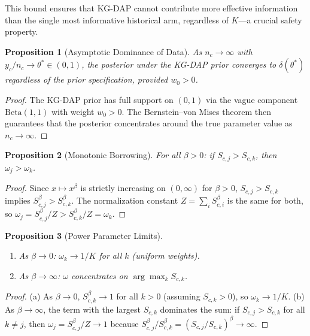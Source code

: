 \documentclass[12pt]{article}
\newtheorem{proposition}{Proposition}
\begin{document}
This bound ensures that KG-DAP cannot contribute more effective information than the single most informative historical arm, regardless of $K$---a crucial safety property.

\begin{proposition}[Asymptotic Dominance of Data]
\label{prop:asymptotic}
As $n_c \to \infty$ with $y_c / n_c \to \theta^* \in (0,1)$, the posterior under the KG-DAP prior converges to $\delta(\theta^*)$ regardless of the prior specification, provided $w_0 > 0$.
\end{proposition}

\begin{proof}
The KG-DAP prior has full support on $(0,1)$ via the vague component $\mathrm{Beta}(1,1)$ with weight $w_0 > 0$. The Bernstein--von Mises theorem then guarantees that the posterior concentrates around the true parameter value as $n_c \to \infty$.
\end{proof}

\begin{proposition}[Monotonic Borrowing]
\label{prop:monotone}
For all $\beta > 0$: if $S_{c,j} > S_{c,k}$, then $\omega_j > \omega_k$.
\end{proposition}

\begin{proof}
Since $x \mapsto x^\beta$ is strictly increasing on $(0, \infty)$ for $\beta > 0$, $S_{c,j} > S_{c,k}$ implies $S_{c,j}^\beta > S_{c,k}^\beta$. The normalization constant $Z = \sum_i S_{c,i}^\beta$ is the same for both, so $\omega_j = S_{c,j}^\beta / Z > S_{c,k}^\beta / Z = \omega_k$.
\end{proof}

\begin{proposition}[Power Parameter Limits]
\label{prop:limits}
\leavevmode
\begin{enumerate}
    \item[(a)] As $\beta \to 0$: $\omega_k \to 1/K$ for all $k$ (uniform weights).
    \item[(b)] As $\beta \to \infty$: $\omega$ concentrates on $\arg\max_k S_{c,k}$.
\end{enumerate}
\end{proposition}

\begin{proof}
(a) As $\beta \to 0$, $S_{c,k}^\beta \to 1$ for all $k > 0$ (assuming $S_{c,k} > 0$), so $\omega_k \to 1/K$.
(b) As $\beta \to \infty$, the term with the largest $S_{c,k}$ dominates the sum: if $S_{c,j} > S_{c,k}$ for all $k \neq j$, then $\omega_j = S_{c,j}^\beta / Z \to 1$ because $S_{c,j}^\beta / S_{c,k}^\beta = (S_{c,j}/S_{c,k})^\beta \to \infty$.
\end{proof}
\end{document}

